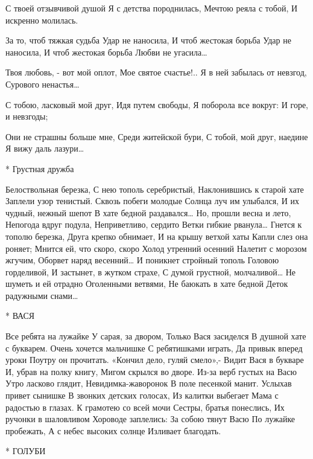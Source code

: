 С твоей отзывчивой душой
Я с детства породнилась,
Мечтою реяла с тобой,
И искренно молилась.

За то, чтоб тяжкая судьба
Удар не наносила,
И чтоб жестокая борьба
Удар не наносила,
И чтоб жестокая борьба
Любви не угасила…

Твоя любовь, - вот мой оплот,
Мое святое счастье!..
Я в ней забылась от невзгод,
Сурового ненастья…

С тобою, ласковый мой друг,
Идя путем свободы,
Я поборола все вокруг:
И горе, и невзгоды;

Они не страшны больше мне,
Среди житейской бури,
С тобой, мой друг, наедине
Я вижу даль лазури…


* Грустная дружба

Белоствольная березка,
С нею тополь серебристый,
Наклонившись к старой хате
Заплели узор тенистый.
Сквозь побеги молодые
Солнца луч им улыбался,
И их чудный, нежный шепот
В хате бедной раздавался…
Но, прошли весна и лето,
Непогода вдруг подула,
Неприветливо, сердито
Ветки гибкие рванула…
Гнется к тополю березка,
Друга крепко обнимает,
И на крышу ветхой хаты
Капли слез она роняет;
Мнится ей, что скоро, скоро
Холод утренний осенний
Налетит с морозом жгучим,
Оборвет наряд весенний…
И поникнет стройный тополь
Головою горделивой,
И застынет, в жутком страхе,
С думой грустной, молчаливой…
Не шуметь и ей отрадно
Оголенными ветвями,
Не баюкать в хате бедной
Деток радужными снами…

* ВАСЯ

Все ребята на лужайке
           У сарая, за двором,
Только Вася засиделся
           В душной хате с букварем.
Очень хочется мальчишке
           С ребятишками играть,
Да привык вперед уроки
           Поутру он прочитать.
«Кончил дело, гуляй смело»,-
            Видит Вася в букваре
И, убрав на полку книгу,
            Мигом скрылся во дворе.
Из-за верб густых на Васю
            Утро ласково глядит,
Невидимка-жаворонок
             В поле песенкой манит.
Услыхав привет сынишке
             В звонких детских голосах,
Из калитки выбегает
             Мама с радостью в глазах.
 К грамотею со всей мочи
             Сестры, братья понеслись,
Их ручонки в шаловливом
            Хороводе заплелись:
За собою тянут Васю
            По лужайке пробежать,
А с небес высоких солнце
            Изливает благодать.


* ГОЛУБИ

